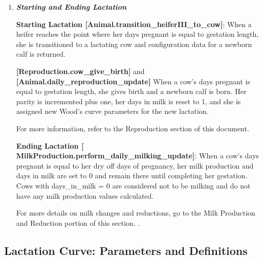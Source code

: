 \begin{refsection}
\begin{enumerate}
        \item \textbf{\textit{Starting and Ending Lactation}} 
        \vspace{0.1cm}
    
    \textbf{Starting Lactation [Animal.transition\_heiferIII\_to\_cow]}: When a heifer reaches the point where her days pregnant is equal to gestation length, she is transitioned to a lactating cow and configuration data for a newborn calf is returned. 
    
    
    \textbf{[Reproduction.cow\_give\_birth]} and \textbf{[Animal.daily\_reproduction\_update]} When a cow’s days pregnant is equal to gestation length, she gives birth and a newborn calf is born. Her parity is incremented plus one, her days in milk is reset to 1, and she is assigned new Wood’s curve parameters for the new lactation. 
    \vspace{0.5cm}




        \begin{tcolorbox}[colback=white, colframe=black, boxrule=0.5pt, arc=3pt, width=\textwidth]
            For more information, refer to the Reproduction section of this document.
        \end{tcolorbox}
        \vspace{0.2cm}
    
    \textbf{Ending Lactation [ MilkProduction.perform\_daily\_milking\_update]}: When a cow’s days pregnant is equal to her dry off days of pregnancy, her milk production and days in milk are set to 0 and remain there until completing her gestation. Cows with days\_in\_milk = 0 are considered not to be milking and do not have any milk production values calculated. 
    \vspace{0.2cm}
            
        \begin{tcolorbox}[colback=white, colframe=black, boxrule=0.5pt, arc=3pt, width=\textwidth]
            For more details on milk changes and reductions, go to the Milk Production and Reduction portion of this section. . 
        \end{tcolorbox}
    
   
    \end{enumerate}

 
\subsection{Lactation Curve: Parameters and Definitions} 
 

\end{refsection}
